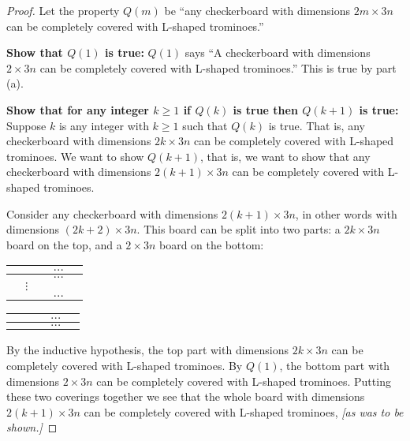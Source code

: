 \documentclass[14pt]{extarticle}
\begin{document}
\begin{proof}
    Let the property $Q(m)$ be ``any checkerboard with dimensions $2m \times 3n$ can be completely covered with L-shaped trominoes.''

    {\bf Show that $Q(1)$ is true:} $Q(1)$ says ``A checkerboard with dimensions $2 \times 3n$ can be completely covered with L-shaped trominoes.'' This is true by part (a).

        {\bf Show that for any integer $k \geq 1$ if $Q(k)$ is true then $Q(k+1)$ is true:} Suppose $k$ is any integer with $k \geq 1$ such that $Q(k)$ is true. That is, any checkerboard with dimensions $2k \times 3n$ can be completely covered with L-shaped trominoes. We want to show $Q(k+1)$, that is, we want to show that any checkerboard with dimensions $2(k+1) \times 3n$ can be completely covered with L-shaped trominoes.

    Consider any checkerboard with dimensions $2(k+1) \times 3n$, in other words with dimensions $(2k+2) \times 3n$. This board can be split into two parts: a $2k \times 3n$ board on the top, and a $2 \times 3n$ board on the bottom:

    \begin{center}
        \begin{tabular}{|c|c|c|c|c|}
            \hline
             &          &  & $\ldots$ & \\
            \hline
             &          &  & $\ldots$ & \\
            \hline
             & $\vdots$ &  &          & \\
            \hline
             &          &  & $\ldots$ & \\
            \hline
        \end{tabular}

        \begin{tabular}{|c|c|c|c|c|}
            \hline
             &  &  & $\ldots$ & \\
            \hline
             &  &  & $\ldots$ & \\
            \hline
        \end{tabular}
    \end{center}

    By the inductive hypothesis, the top part with dimensions $2k \times 3n$ can be completely covered with L-shaped trominoes. By $Q(1)$, the bottom part with dimensions $2 \times 3n$ can be completely covered with L-shaped trominoes. Putting these two coverings together we see that the whole board with dimensions $2(k+1) \times 3n$ can be completely covered with L-shaped trominoes, {\it [as was to be shown.]}
\end{proof}
\end{document}
